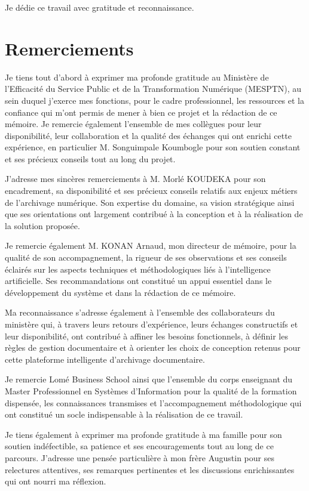 \documentclass[12pt,a4paper]{report}
\begin{document}
Je dédie ce travail avec gratitude et reconnaissance.

\clearpage
\chapter*{Remerciements}
Je tiens tout d’abord à exprimer ma profonde gratitude au Ministère de l’Efficacité du Service Public et de la Transformation Numérique (MESPTN), au sein duquel j’exerce mes fonctions, pour le cadre professionnel, les ressources et la confiance qui m’ont permis de mener à bien ce projet et la rédaction de ce mémoire. Je remercie également l’ensemble de mes collègues pour leur disponibilité, leur collaboration et la qualité des échanges qui ont enrichi cette expérience, en particulier M. Songuimpale Koumbogle pour son soutien constant et ses précieux conseils tout au long du projet.

J’adresse mes sincères remerciements à M. Morlé KOUDEKA pour son encadrement, sa disponibilité et ses précieux conseils relatifs aux enjeux métiers de l’archivage numérique. Son expertise du domaine, sa vision stratégique ainsi que ses orientations ont largement contribué à la conception et à la réalisation de la solution proposée.

Je remercie également M. KONAN Arnaud, mon directeur de mémoire, pour la qualité de son accompagnement, la rigueur de ses observations et ses conseils éclairés sur les aspects techniques et méthodologiques liés à l’intelligence artificielle. Ses recommandations ont constitué un appui essentiel dans le développement du système et dans la rédaction de ce mémoire.

Ma reconnaissance s’adresse également à l’ensemble des collaborateurs du ministère qui, à travers leurs retours d’expérience, leurs échanges constructifs et leur disponibilité, ont contribué à affiner les besoins fonctionnels, à définir les règles de gestion documentaire et à orienter les choix de conception retenus pour cette plateforme intelligente d’archivage documentaire.

Je remercie Lomé Business School ainsi que l’ensemble du corps enseignant du Master Professionnel en Systèmes d’Information pour la qualité de la formation dispensée, les connaissances transmises et l’accompagnement méthodologique qui ont constitué un socle indispensable à la réalisation de ce travail.

Je tiens également à exprimer ma profonde gratitude à ma famille pour son soutien indéfectible, sa patience et ses encouragements tout au long de ce parcours. J’adresse une pensée particulière à mon frère Augustin pour ses relectures attentives, ses remarques pertinentes et les discussions enrichissantes qui ont nourri ma réflexion.
\end{document}
